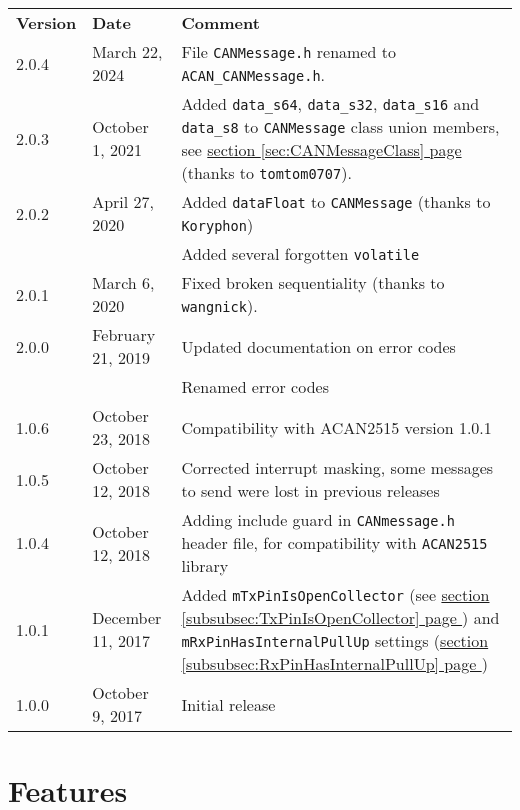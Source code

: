 \documentclass[10pt, a4paper, obeyspaces, openany]{extarticle}
\newcommand\refSectionPage[1]{\hyperref[sec:#1]{section \ref*{sec:#1} page \pageref{sec:#1}}}
\newcommand\refSubsubsectionPage[1]{\hyperref[subsubsec:#1]{section \ref*{subsubsec:#1} page \pageref{subsubsec:#1}}}
\begin{document}
\begin{center}
  \begin{tabular}{llp{10cm}}
    \textbf{Version} & \textbf{Date} & \textbf{Comment}\\
    2.0.4 & March 22, 2024 & File \texttt{CANMessage.h} renamed to \texttt{ACAN\_CANMessage.h}.\\
    2.0.3 & October 1, 2021 & Added \texttt{data\_s64}, \texttt{data\_s32}, \texttt{data\_s16} and \texttt{data\_s8} to \texttt{CANMessage} class union members, see \refSectionPage{CANMessageClass} (thanks to \texttt{tomtom0707}).\\
    2.0.2 & April 27, 2020 & Added \texttt{dataFloat} to \texttt{CANMessage} (thanks to \texttt{Koryphon})\\
          &                & Added several forgotten \texttt{volatile}\\
    2.0.1 & March 6, 2020 & Fixed broken sequentiality (thanks to \texttt{wangnick}).\\
    2.0.0 & February 21, 2019 & Updated documentation on error codes\\
          &                   & Renamed error codes\\
    1.0.6 &  October 23, 2018 & Compatibility with ACAN2515 version 1.0.1\\
    1.0.5 &  October 12, 2018 & Corrected interrupt masking, some messages to send were lost in previous releases \\
    1.0.4 &  October 12, 2018 & Adding include guard in \texttt{CANmessage.h} header file, for compatibility with \texttt{ACAN2515} library\\
    1.0.1 & December 11, 2017 & Added \texttt{mTxPinIsOpenCollector} (see \refSubsubsectionPage{TxPinIsOpenCollector}) and \texttt{mRxPinHasInternalPullUp} settings (\refSubsubsectionPage{RxPinHasInternalPullUp}) \\
    1.0.0 & October 9, 2017 & Initial release \\
  \end{tabular}
\end{center}

\section{Features}
\end{document}
